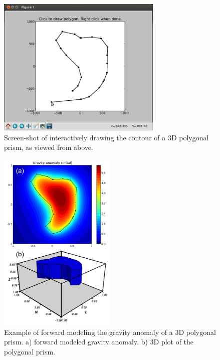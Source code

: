 \begin{figure}
    \centering
    \includegraphics[width=0.7\textwidth]{figures/paper-fatiando/forward_modeling_polyprism_drawing}
    \caption{
        Screen-shot of interactively drawing the contour of a 3D polygonal
        prism, as viewed from above.
    }
    \label{fig:p1-drawing}
\end{figure}

\begin{figure}
    \centering
    \includegraphics[width=0.5\textwidth]{figures/paper-fatiando/forward_modeling_polyprism}
    \caption{
        Example of forward modeling the gravity anomaly of a 3D polygonal
        prism.
        a) forward modeled gravity anomaly.
        b) 3D plot of the polygonal prism.
    }
    \label{fig:p1-polyprism}
\end{figure}





